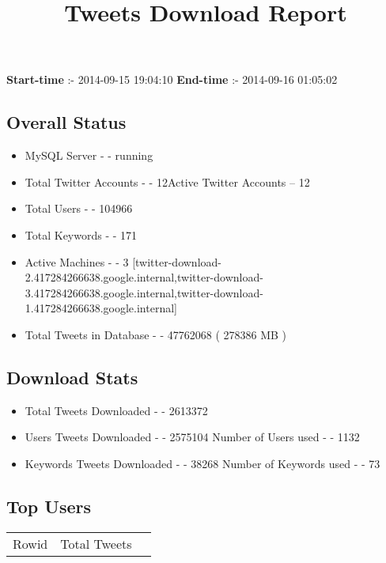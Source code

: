 \documentclass{article}\usepackage[T1]{fontenc}
\begin{document}
\title{\textbf{Tweets Download Report}}
               \date{}
                \maketitle
               \centerline{\textbf{Start-time} :- 2014-09-15 19:04:10 \hspace{40pt} \textbf{End-time} :- 2014-09-16 01:05:02}               \subsection*{Overall Status}                \begin{itemize}                \item MySQL Server - - running               \item Total Twitter Accounts - - 12\newline Active Twitter Accounts -- 12               \item Total Users - - 104966               \item Total Keywords - - 171               \item Active Machines - - 3 [twitter-download-2.417284266638.google.internal,twitter-download-3.417284266638.google.internal,twitter-download-1.417284266638.google.internal]               \item Total Tweets in Database - - 47762068 ( 278386 MB )               \end{itemize}               \subsection*{Download Stats}                \begin{itemize}                \item Total Tweets Downloaded - - 2613372               \item Users Tweets Downloaded - - 2575104 \newline Number of Users used - - 1132               \item Keywords Tweets Downloaded - - 38268 \newline Number of Keywords used - - 73              \end{itemize}              \subsection*{Top Users}\begin{tabular}{|c|c|c|}         \hline         Rowid & Total Tweets \\ 

\end{tabular}
\end{document}
